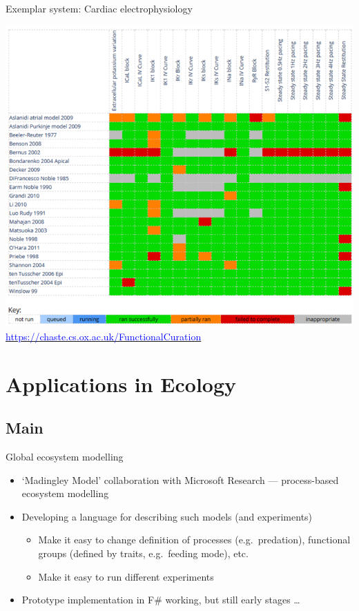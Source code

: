 \documentclass[t,xcolor={usenames,dvipsnames}]{beamer}
\newcommand{\myhref}[2]{\href{#1}{\textcolor{Blue}{#2}}}
\newcommand{\myurl}[1]{\myhref{#1}{#1}}
\begin{document}
\begin{frame}{Exemplar system: Cardiac electrophysiology}
\begin{center}
\vspace{-.5cm}
\includegraphics[height=.8\textheight]{cardiac_fc_matrix}\\
\myurl{https://chaste.cs.ox.ac.uk/FunctionalCuration}
\end{center}
\end{frame}


\section{Applications in Ecology}
\subsection*{Main}

\begin{frame}{Global ecosystem modelling}
\begin{itemize}
\item `Madingley Model' collaboration with Microsoft Research --- process-based ecosystem modelling
\item Developing a language for describing such models (and experiments)
  \begin{itemize}
  \item Make it easy to change definition of \alert{processes} (e.g.\ predation), \alert{functional groups} (defined by \alert{traits}, e.g.\ feeding mode), etc.
  \item Make it easy to run different experiments
  \end{itemize}
\item Prototype implementation in F\# working, but still early stages \ldots
\end{itemize}
\end{frame}
\end{document}
